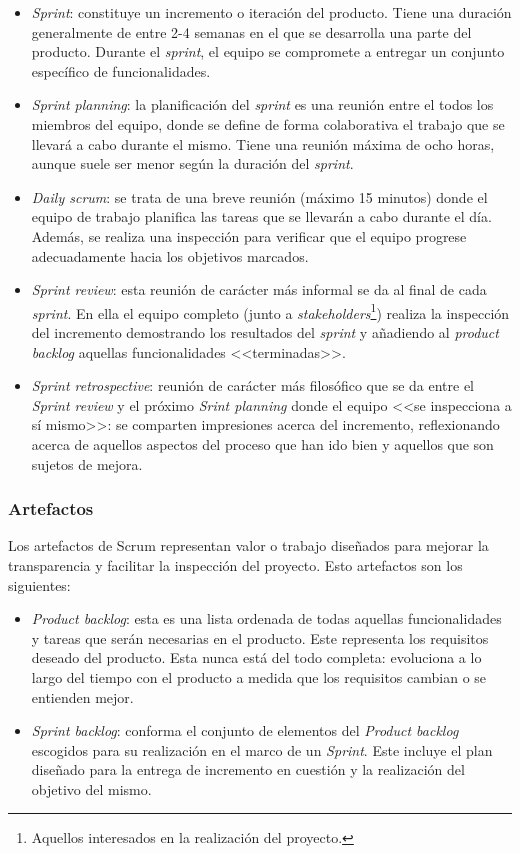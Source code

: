 \begin{itemize}

    \item \textit{Sprint}: constituye un incremento o iteración del producto. Tiene una duración generalmente de entre 2-4 semanas en el que se desarrolla una parte del producto. Durante el \textit{sprint}, el equipo se compromete a entregar un conjunto específico de funcionalidades.
    \item \textit{Sprint planning}: la planificación del \textit{sprint} es una reunión entre el todos los miembros del equipo, donde se define de forma colaborativa el trabajo que se llevará a cabo durante el mismo. Tiene una reunión máxima de ocho horas, aunque suele ser menor según la duración del \textit{sprint}.
    \item \textit{Daily scrum}: se trata de una breve reunión (máximo 15 minutos) donde el equipo de trabajo planifica las tareas que se llevarán a cabo durante el día. Además, se realiza una inspección para verificar que el equipo progrese adecuadamente hacia los objetivos marcados.
    \item \textit{Sprint review}: esta reunión de carácter más informal se da al final de cada \textit{sprint}. En ella el equipo completo (junto a \textit{stakeholders}\footnote{Aquellos interesados en la realización del proyecto.}) realiza la inspección del incremento demostrando los resultados del \textit{sprint} y añadiendo al \textit{product backlog} aquellas funcionalidades <<terminadas>>.
    \item \textit{Sprint retrospective}: reunión de carácter más filosófico que se da entre el \textit{Sprint review} y el próximo \textit{Srint planning} donde el equipo <<se inspecciona a sí mismo>>: se comparten impresiones acerca del incremento, reflexionando acerca de aquellos aspectos del proceso que han ido bien y aquellos que son sujetos de mejora.

\end{itemize}

\subsubsection{Artefactos}

Los artefactos de Scrum representan valor o trabajo diseñados para mejorar la transparencia y facilitar la inspección del proyecto. Esto artefactos son los siguientes:

\begin{itemize}
    \item \textit{Product backlog}: esta es una lista ordenada de todas aquellas funcionalidades y tareas que serán necesarias en el producto. Este representa los requisitos deseado del producto. Esta nunca está del todo completa: evoluciona a lo largo del tiempo con el producto a medida que los requisitos cambian o se entienden mejor.
    \item \textit{Sprint backlog}: conforma el conjunto de elementos del \textit{Product backlog} escogidos para su realización en el marco de un \textit{Sprint}. Este incluye el plan diseñado para la entrega de incremento en cuestión y la realización del objetivo del mismo.
\end{itemize}

